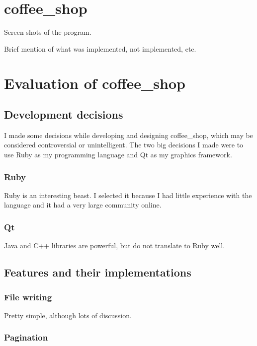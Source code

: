 \documentclass[11pt]{article}
\begin{document}
\section{coffee\_shop}

Screen shots of the program.

Brief mention of what was implemented, not implemented, etc.

\section{Evaluation of coffee\_shop}

\subsection{Development decisions}

I made some decisions while developing and designing coffee\_shop, which may be considered controversial or unintelligent. The two big decisions I made were to use Ruby as my programming language and Qt as my graphics framework.

\subsubsection{Ruby}

Ruby is an interesting beast. I selected it because I had little experience with the language and it had a very large community online.

\subsubsection{Qt}

Java and C++ libraries are powerful, but do not translate to Ruby well.

\subsection{Features and their implementations}

\subsubsection{File writing}

Pretty simple, although lots of discussion.

\subsubsection{Pagination}
\end{document}
